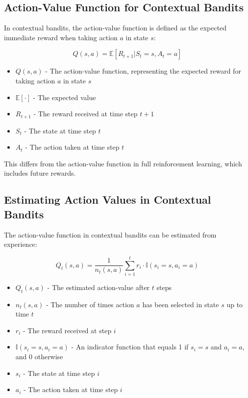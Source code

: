 \documentclass[12pt,a4paper]{article}
\begin{document}
\subsection{Action-Value Function for Contextual Bandits}

In contextual bandits, the action-value function is defined as the expected immediate reward when taking action $a$ in state $s$:

\begin{equation}
Q(s,a) = \mathbb{E}[R_{t+1}|S_t = s, A_t = a]
\end{equation}

\begin{tcolorbox}[title=Notation Overview]
\begin{itemize}
    \item $Q(s,a)$ - The action-value function, representing the expected reward for taking action $a$ in state $s$
    \item $\mathbb{E}[\cdot]$ - The expected value
    \item $R_{t+1}$ - The reward received at time step $t+1$
    \item $S_t$ - The state at time step $t$
    \item $A_t$ - The action taken at time step $t$
\end{itemize}
\end{tcolorbox}

This differs from the action-value function in full reinforcement learning, which includes future rewards.

\subsection{Estimating Action Values in Contextual Bandits}

The action-value function in contextual bandits can be estimated from experience:

\begin{equation}
Q_t(s,a) = \frac{1}{n_t(s,a)} \sum_{i=1}^{t} r_i \cdot \mathbb{I}(s_i = s, a_i = a)
\end{equation}

\begin{tcolorbox}[title=Notation Overview]
\begin{itemize}
    \item $Q_t(s,a)$ - The estimated action-value after $t$ steps
    \item $n_t(s,a)$ - The number of times action $a$ has been selected in state $s$ up to time $t$
    \item $r_i$ - The reward received at step $i$
    \item $\mathbb{I}(s_i = s, a_i = a)$ - An indicator function that equals 1 if $s_i = s$ and $a_i = a$, and 0 otherwise
    \item $s_i$ - The state at time step $i$
    \item $a_i$ - The action taken at time step $i$
\end{itemize}
\end{tcolorbox}
\end{document}

